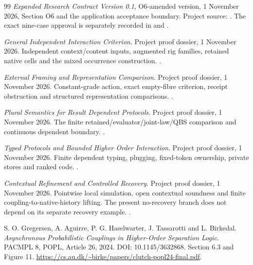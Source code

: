 \begin{thebibliography}{99}
\emph{Expanded Research Contract Version 0.1}, O6-amended version,
1 November 2026, Section O6 and the application acceptance boundary.
Project source: .
The exact nine-case approval is separately recorded in
 and
.

\emph{General Independent Interaction Criterion}. Project proof dossier,
1 November 2026. Independent context/content inputs, augmented rig
families, retained native cells and the mixed occurrence construction.
.

\emph{External Framing and Representation Comparison}. Project proof
dossier, 1 November 2026. Constant-grade action, exact empty-fibre
criterion, receipt obstruction and structured representation comparisons.
.

\emph{Plural Semantics for Result Dependent Protocols}. Project proof
dossier, 1 November 2026. The finite retained/evaluator/joint-law/QBS
comparison and continuous dependent boundary.
.

\emph{Typed Protocols and Bounded Higher Order Interaction}. Project
proof dossier, 1 November 2026. Finite dependent typing, plugging,
fixed-token ownership, private stores and ranked code.
.

\emph{Contextual Refinement and Controlled Recovery}. Project proof
dossier, 1 November 2026. Pointwise local simulation, open contextual
soundness and finite coupling-to-native-history lifting. The present
no-recovery branch does not depend on its separate recovery example.
.

S. O. Gregersen, A. Aguirre, P. G. Haselwarter, J. Tassarotti and
L. Birkedal. \emph{Asynchronous Probabilistic Couplings in Higher-Order
Separation Logic}. PACMPL 8, POPL, Article 26, 2024.
DOI: 10.1145/3632868. Section 6.3 and Figure 11.
\url{https://cs.au.dk/~birke/papers/clutch-popl24-final.pdf}.
\end{thebibliography}


